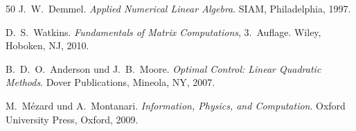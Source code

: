 ﻿\documentclass[a4paper,12pt]{report}
\theoremstyle{definition}
\begin{document}
\begin{thebibliography}{50}
J.~W.~Demmel.
\newblock \textit{Applied Numerical Linear Algebra}.
\newblock SIAM, Philadelphia, 1997.

D.~S.~Watkins.
\newblock \textit{Fundamentals of Matrix Computations}, 3.~Auflage.
\newblock Wiley, Hoboken, NJ, 2010.

B.~D.~O.~Anderson und J.~B.~Moore.
\newblock \textit{Optimal Control: Linear Quadratic Methods}.
\newblock Dover Publications, Mineola, NY, 2007.

M.~Mézard und A.~Montanari.
\newblock \textit{Information, Physics, and Computation}.
\newblock Oxford University Press, Oxford, 2009.

\end{thebibliography}
\end{document}
